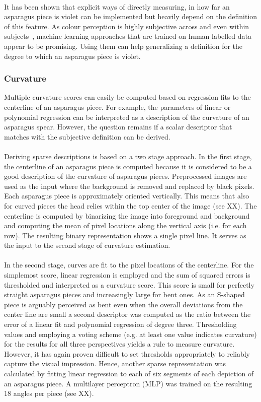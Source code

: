\\
It has been shown that explicit ways of directly measuring, in how far an asparagus piece is violet can be implemented but heavily depend on the definition of this feature. As colour perception is highly subjective across and even within subjects~\citep{reeves1981metacontrast}, machine learning approaches that are trained on human labelled data appear to be promising. Using them can help generalizing a definition for the degree to which an asparagus piece is violet.


\subsubsection{Curvature}

Multiple curvature scores can easily be computed based on regression fits to the centerline of an asparagus piece. For example, the parameters of linear or polynomial regression can be interpreted as a description of the curvature of an asparagus spear. However, the question remains if a scalar descriptor that matches with the subjective definition can be derived. \\
\\
Deriving sparse descriptions is based on a two stage approach. In the first stage, the centerline of an asparagus piece is computed because it is considered to be a good description of the curvature of asparagus pieces. Preprocessed images are used as the input where the background is removed and replaced by black pixels. Each asparagus piece is approximately oriented vertically. This means that also for curved pieces the head relies within the top center of the image (see XX). The centerline is computed by binarizing the image into foreground and background and computing the mean of pixel locations along the vertical axis (i.e. for each row). The resulting binary representation shows a single pixel line. It serves as the input to the second stage of curvature estimation. \\
\\
In the second stage, curves are fit to the pixel locations of the centerline. For the simplemost score, linear regression is employed and the sum of squared errors is thresholded and interpreted as a curvature score. This score is small for perfectly straight asparagus pieces and increasingly large for bent ones. As an S-shaped piece is arguably perceived as bent even when the overall deviations from the center line are small a second descriptor was computed as the ratio between the error of a linear fit and polynomial regression of degree three. Thresholding values and employing a voting scheme (e.g. at least one value indicates curvature) for the results for all three perspectives yields a rule to measure curvature. However, it has again proven difficult to set thresholds appropriately to reliably capture the visual impression. Hence, another sparse representation was calculated by fitting linear regression to each of six segments of each depiction of an asparagus piece. A multilayer perceptron (MLP) was trained on the resulting 18 angles per piece (see XX). \\

